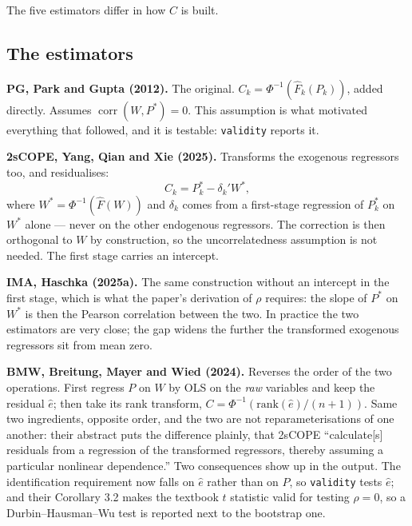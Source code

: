 \documentclass[11pt]{article}
\newcommand{\stcmd}[1]{\texttt{#1}}
\begin{document}
The five estimators differ in how $C$ is built.

\subsection{The estimators}

\textbf{PG, Park and Gupta (2012).} The original.
$C_k = \Phi^{-1}(\hat F_k(P_k))$, added directly. Assumes
$\operatorname{corr}(W, P^*) = 0$. This assumption is what motivated
everything that followed, and it is testable: \stcmd{validity} reports it.

\textbf{2sCOPE, Yang, Qian and Xie (2025).} Transforms the exogenous
regressors too, and residualises:
\begin{equation}
C_k = P^*_k - \delta_k' W^* ,
\end{equation}
where $W^* = \Phi^{-1}(\hat F(W))$ and $\delta_k$ comes from a first-stage
regression of $P^*_k$ on $W^*$ alone --- never on the other endogenous
regressors. The correction is then orthogonal to $W$ by construction, so the
uncorrelatedness assumption is not needed. The first stage carries an
intercept.

\textbf{IMA, Haschka (2025a).} The same construction without an intercept in
the first stage, which is what the paper's derivation of $\rho$ requires: the
slope of $P^*$ on $W^*$ is then the Pearson correlation between the two. In
practice the two estimators are very close; the gap widens the further the
transformed exogenous regressors sit from mean zero.

\textbf{BMW, Breitung, Mayer and Wied (2024).} Reverses the order of the two
operations. First regress $P$ on $W$ by OLS on the \emph{raw} variables and
keep the residual $\hat e$; then take its rank transform,
$C = \Phi^{-1}(\text{rank}(\hat e)/(n+1))$. Same two ingredients, opposite
order, and the two are not reparameterisations of one another: their abstract
puts the difference plainly, that 2sCOPE ``calculate[s] residuals from a
regression of the transformed regressors, thereby assuming a particular
nonlinear dependence.'' Two consequences show up in the output. The
identification requirement now falls on $\hat e$ rather than on $P$, so
\stcmd{validity} tests $\hat e$; and their Corollary 3.2 makes the textbook
$t$ statistic valid for testing $\rho = 0$, so a Durbin--Hausman--Wu test is
reported next to the bootstrap one.
\end{document}
